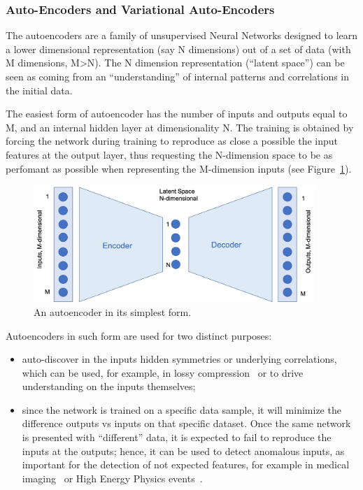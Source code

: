 \subsubsection{Auto-Encoders and Variational Auto-Encoders}
\label{sec:unsupervised}
The autoencoders are a family of unsupervised Neural Networks designed to learn a lower dimensional representation (say N dimensions) out of a set of data (with M dimensions, M\textgreater N). The N dimension representation (``latent space'') can be seen as coming from an ``understanding'' of internal patterns and correlations in the initial data.

The easiest form of autoencoder has the number of inputs and outputs equal to M, and an internal hidden layer at dimensionality N. The training is obtained by forcing the network during training to reproduce as close a possible the input features at the output layer, thus requesting the N-dimension space to be as perfomant as possible when representing the M-dimension inputs (see Figure~\ref{fig:autoencoder}).

\begin{figure}[htb]
     \centering
     \includegraphics[width=0.95\textwidth]{images/autoencoder.png}
     \caption{An autoencoder in its simplest form.}
     \label{fig:autoencoder}
 \end{figure}
 
 Autoencoders in such form are used for two distinct purposes:
 \begin{itemize}
     \item auto-discover in the inputs hidden symmetries or underlying correlations, which can be used, for example, in lossy compression~\cite{Liu2021} or to drive understanding on the inputs themselves; %
     \item since the network is trained on a specific data sample, it will minimize the difference outputs vs inputs on that specific dataset. Once the same network is presented with ``different'' data, it is expected to fail to reproduce the inputs at the outputs; hence, it can be used to detect anomalous inputs, as important for the detection of not expected features, for example in medical imaging~\cite{Liu2021} or High Energy Physics events~\cite{Knapp2021}. 
 \end{itemize}
 
